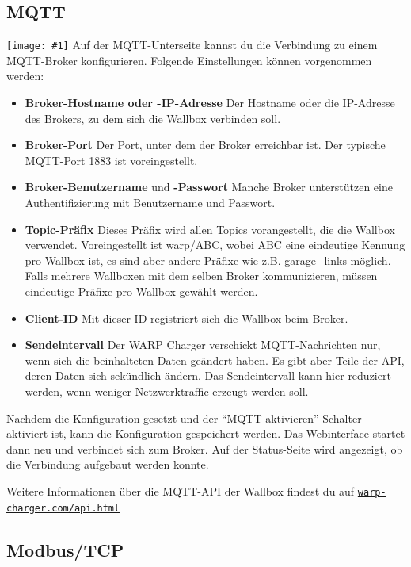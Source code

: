 \documentclass[a4paper,10pt]{article}
\newcommand{\gfx}[1]{\texttt{[image: \#1]}}
\newcommand\rurl[2]{%
  \href{#1}{\nolinkurl{#2}}%
}
\begin{document}
\begin{multicols*}{2}
	\subsection{MQTT}\label{mqtt-interface}

	\gfx{./img_warp2/resized/web_mqtt}
	Auf der MQTT-Unterseite kannst du die Verbindung zu einem MQTT-Broker konfigurieren. Folgende Einstellungen können vorgenommen werden:
	\begin{itemize}
		\item \textbf{Broker-Hostname oder -IP-Adresse} Der Host\-name oder die IP-Adresse des Brokers, zu dem sich die Wallbox verbinden soll.
		\item \textbf{Broker-Port} Der Port, unter dem der Broker erreichbar ist. Der typische MQTT-Port 1883 ist voreingestellt.
		\item \textbf{Broker-Benutzername} und \textbf{-Passwort} Manche Broker unterstützen eine Authentifizierung mit Benutzername und Passwort.
		\item \textbf{Topic-Präfix} Dieses Präfix wird allen Topics vorangestellt, die die Wallbox verwendet.
		      Voreingestellt ist warp/ABC, wobei ABC eine eindeutige Kennung pro Wallbox ist,
		      es sind aber andere Präfixe wie z.B. garage\_links möglich.
		      Falls mehrere Wallboxen mit dem selben Broker kommunizieren,
		      müssen eindeutige Präfixe pro Wallbox gewählt werden.
		\item \textbf{Client-ID} Mit dieser ID registriert sich die Wallbox beim Broker.
		\item \textbf{Sendeintervall} Der WARP Charger verschickt MQTT-Nachrichten nur, wenn sich die beinhalteten Daten geändert haben.
			Es gibt aber Teile der API, deren Daten sich sekündlich ändern. Das Sendeintervall kann hier reduziert werden, wenn weniger Netzwerktraffic
			erzeugt werden soll.
	\end{itemize}
	Nachdem die Konfiguration gesetzt und der \enquote{MQTT aktivieren}-Schalter aktiviert ist, kann die Konfiguration gespeichert werden.
	Das Webinterface startet dann neu und verbindet sich zum Broker.
	Auf der Status-Seite wird angezeigt, ob die Verbindung aufgebaut werden konnte.

	Weitere Informationen über die MQTT-API der Wallbox findest du auf \rurl{https://warp-charger.com/api.html}{warp-charger.com/api.html}

	\subsection{Modbus/TCP}


\end{multicols*}
\end{document}
